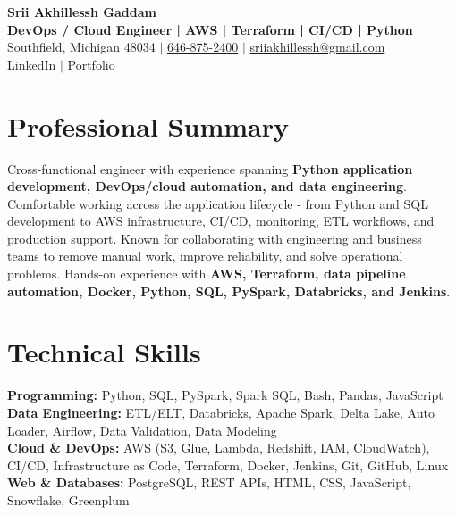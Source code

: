 \documentclass[letterpaper,10pt]{article}
\begin{document}
\fontsize{9.35pt}{10.45pt}\selectfont

\begin{center}
    {\LARGE \textbf{Srii Akhillessh Gaddam}} \\[-1pt]
    \textbf{DevOps / Cloud Engineer | AWS | Terraform | CI/CD | Python} \\[2pt]
    Southfield, Michigan 48034 $|$
    \href{tel:6468752400}{646-875-2400} $|$
    \href{mailto:sriiakhillessh@gmail.com}{sriiakhillessh@gmail.com} \\[1pt]
    \href{https://www.linkedin.com/in/srii-akhiilessh-gaddam-b48668191/}{LinkedIn} $|$
    \href{https://sriiakhillesshg.github.io/portfolio/}{Portfolio}
\end{center}
\vspace{-8pt}

\section{Professional Summary}
\small{Cross-functional engineer with experience spanning \textbf{Python application development, DevOps/cloud automation, and data engineering}. Comfortable working across the application lifecycle - from Python and SQL development to AWS infrastructure, CI/CD, monitoring, ETL workflows, and production support. Known for collaborating with engineering and business teams to remove manual work, improve reliability, and solve operational problems. Hands-on experience with \textbf{AWS, Terraform, data pipeline automation, Docker, Python, SQL, PySpark, Databricks, and Jenkins}.}

\section{Technical Skills}
\small{
\textbf{Programming:} Python, SQL, PySpark, Spark SQL, Bash, Pandas, JavaScript \\
\textbf{Data Engineering:} ETL/ELT, Databricks, Apache Spark, Delta Lake, Auto Loader, Airflow, Data Validation, Data Modeling \\
\textbf{Cloud \& DevOps:} AWS (S3, Glue, Lambda, Redshift, IAM, CloudWatch), CI/CD, Infrastructure as Code, Terraform, Docker, Jenkins, Git, GitHub, Linux \\
\textbf{Web \& Databases:} PostgreSQL, REST APIs, HTML, CSS, JavaScript, Snowflake, Greenplum
}
\end{document}
